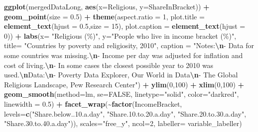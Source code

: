 \documentclass[
]{article}
\newenvironment{Shaded}{\begin{snugshade}}{\end{snugshade}}
\newcommand{\AttributeTok}[1]{\textcolor[rgb]{0.13,0.29,0.53}{#1}}
\newcommand{\ConstantTok}[1]{\textcolor[rgb]{0.56,0.35,0.01}{#1}}
\newcommand{\DecValTok}[1]{\textcolor[rgb]{0.00,0.00,0.81}{#1}}
\newcommand{\FloatTok}[1]{\textcolor[rgb]{0.00,0.00,0.81}{#1}}
\newcommand{\FunctionTok}[1]{\textcolor[rgb]{0.13,0.29,0.53}{\textbf{#1}}}
\newcommand{\NormalTok}[1]{#1}
\newcommand{\SpecialCharTok}[1]{\textcolor[rgb]{0.81,0.36,0.00}{\textbf{#1}}}
\newcommand{\StringTok}[1]{\textcolor[rgb]{0.31,0.60,0.02}{#1}}
\begin{document}
\begin{Shaded}
\begin{Highlighting}[]
\FunctionTok{ggplot}\NormalTok{(mergedDataLong, }\FunctionTok{aes}\NormalTok{(}\AttributeTok{x=}\NormalTok{Religious, }\AttributeTok{y=}\NormalTok{ShareInBracket)) }\SpecialCharTok{+}
  \FunctionTok{geom\_point}\NormalTok{(}\AttributeTok{size =} \FloatTok{0.5}\NormalTok{) }\SpecialCharTok{+}
  \FunctionTok{theme}\NormalTok{(}\AttributeTok{aspect.ratio =} \DecValTok{1}\NormalTok{,}
        \AttributeTok{plot.title =} \FunctionTok{element\_text}\NormalTok{(}\AttributeTok{hjust =} \FloatTok{0.5}\NormalTok{,}\AttributeTok{size =} \DecValTok{15}\NormalTok{),}
        \AttributeTok{plot.caption =} \FunctionTok{element\_text}\NormalTok{(}\AttributeTok{hjust =} \DecValTok{0}\NormalTok{)) }\SpecialCharTok{+}
  \FunctionTok{labs}\NormalTok{(}\AttributeTok{x=} \StringTok{"Religious (\%)"}\NormalTok{, }
       \AttributeTok{y=}\StringTok{"People who live in income bracket (\%)"}\NormalTok{,}
       \AttributeTok{title=} \StringTok{"Countries by poverty and religiosity, 2010"}\NormalTok{,}
       \AttributeTok{caption =} \StringTok{"Notes:}\SpecialCharTok{\textbackslash{}n}\StringTok{{-} Data for some countries was missing.}\SpecialCharTok{\textbackslash{}n}\StringTok{{-} Income per day was adjusted for inflation and cost of living.}\SpecialCharTok{\textbackslash{}n}\StringTok{{-} In some cases the closest possible year to 2010 was used.}\SpecialCharTok{\textbackslash{}n}\StringTok{Data:}\SpecialCharTok{\textbackslash{}n}\StringTok{{-} \textquotesingle{}Poverty Data Explorer\textquotesingle{}, Our World in Data}\SpecialCharTok{\textbackslash{}n}\StringTok{{-} \textquotesingle{}The Global Religious Landscape\textquotesingle{}, Pew Research Center"}\NormalTok{) }\SpecialCharTok{+}
  \FunctionTok{ylim}\NormalTok{(}\DecValTok{0}\NormalTok{,}\DecValTok{100}\NormalTok{) }\SpecialCharTok{+}
  \FunctionTok{xlim}\NormalTok{(}\DecValTok{0}\NormalTok{,}\DecValTok{100}\NormalTok{) }\SpecialCharTok{+}
  \FunctionTok{geom\_smooth}\NormalTok{(}\AttributeTok{method=}\NormalTok{lm, }\AttributeTok{se=}\ConstantTok{FALSE}\NormalTok{, }\AttributeTok{linetype=}\StringTok{"solid"}\NormalTok{, }\AttributeTok{color=}\StringTok{"darkred"}\NormalTok{, }\AttributeTok{linewidth =} \FloatTok{0.5}\NormalTok{) }\SpecialCharTok{+}
  \FunctionTok{facet\_wrap}\NormalTok{(}\SpecialCharTok{\textasciitilde{}}\FunctionTok{factor}\NormalTok{(IncomeBracket, }\AttributeTok{levels=}\FunctionTok{c}\NormalTok{(}\StringTok{"Share.below..10.a.day"}\NormalTok{,}
                                             \StringTok{"Share.10.to.20.a.day"}\NormalTok{,}
                                             \StringTok{"Share.20.to.30.a.day"}\NormalTok{,}
                                             \StringTok{"Share.30.to.40.a.day"}\NormalTok{)),}
             \AttributeTok{scales=}\StringTok{"free\_y"}\NormalTok{, }\AttributeTok{ncol=}\DecValTok{2}\NormalTok{, }\AttributeTok{labeller=}\NormalTok{ variable\_labeller)}
\end{Highlighting}
\end{Shaded}
\end{document}
